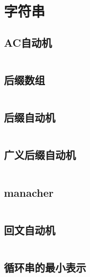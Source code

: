 \section{字符串}
\subsection{AC自动机}
\inputminted{cpp}{\source/string/Aho-Corasick-automaton.cpp}
\subsection{后缀数组}
\inputminted{cpp}{\source/string/suffix-array.cpp}
\subsection{后缀自动机}
\inputminted{cpp}{\source/string/suffix-automaton.cpp}
\subsection{广义后缀自动机}
\inputminted{cpp}{\source/string/ex-suffix-automaton.cpp}
\subsection{manacher}
\inputminted{cpp}{\source/string/Manacher.cpp}
\subsection{回文自动机}
\inputminted{cpp}{\source/string/palindromic-tree.cpp}
\subsection{循环串的最小表示}
\inputminted{cpp}{\source/string/minexpress.cpp}
